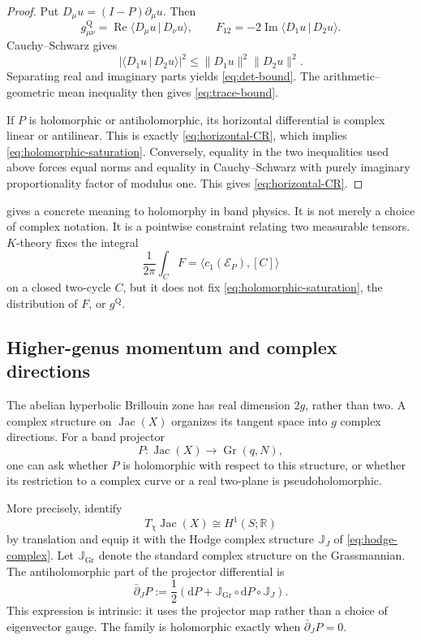 \documentclass[11pt]{article}
\theoremstyle{definition}
\theoremstyle{remark}
\newcommand{\RR}{\mathbb R}
\newcommand{\Jac}{\operatorname{Jac}}
\newcommand{\dd}{\mathrm d}
\newcommand{\braket}[2]{\langle #1\,|\,#2\rangle}
\begin{document}
\begin{proof}
Put \(D_\mu u=(I-P)\partial_\mu u\).  Then
\[
   g_{\mu\nu}^{\mathrm Q}
       =\operatorname{Re}\braket{D_\mu u}{D_\nu u},
   \qquad
   F_{12}=-2\operatorname{Im}\braket{D_1u}{D_2u}.
\]
Cauchy--Schwarz gives
\[
 |\braket{D_1u}{D_2u}|^2
   \leq\|D_1u\|^2\|D_2u\|^2.
\]
Separating real and imaginary parts yields
\eqref{eq:det-bound}.  The arithmetic--geometric mean inequality then gives
\eqref{eq:trace-bound}.

If \(P\) is holomorphic or antiholomorphic, its horizontal differential is
complex linear or antilinear.  This is exactly
\eqref{eq:horizontal-CR}, which implies
\eqref{eq:holomorphic-saturation}.  Conversely, equality in the two
inequalities used above forces equal norms and equality in Cauchy--Schwarz
with purely imaginary proportionality factor of modulus one.  This gives
\eqref{eq:horizontal-CR}.
\end{proof}

 gives a concrete meaning to holomorphy in
band physics.  It is not merely a choice of complex notation.  It is a
pointwise constraint relating two measurable tensors.  \(K\)-theory fixes the
integral
\[
                \frac1{2\pi}\int_C F
                =\langle c_1(\mathscr E_P),[C]\rangle
                \tag{7.15}\label{eq:chern-integral}
\]
on a closed two-cycle \(C\), but it does not fix
\eqref{eq:holomorphic-saturation}, the distribution of \(F\), or
\(g^{\mathrm Q}\).

\subsection{Higher-genus momentum and complex directions}

The abelian hyperbolic Brillouin zone has real dimension \(2g\), rather than
two.  A complex structure on \(\Jac(X)\) organizes its tangent space into
\(g\) complex directions.  For a band projector
\[
             P:\Jac(X)\longrightarrow\operatorname{Gr}(q,N),
\]
one can ask whether \(P\) is holomorphic with respect to this structure, or
whether its restriction to a complex curve or a real two-plane is
pseudoholomorphic.

More precisely, identify
\[
 T_\chi\Jac(X)\cong H^1(S;\RR)
\]
by translation and equip it with the Hodge complex structure
\(\mathbb J_J\) of \eqref{eq:hodge-complex}.  Let
\(\mathbb J_{\mathrm{Gr}}\) denote the standard complex structure on the
Grassmannian.  The antiholomorphic part of the projector differential is
\[
 \bar\partial_JP
   :=\frac12\left(
       \dd P+
       \mathbb J_{\mathrm{Gr}}\circ\dd P\circ\mathbb J_J
     \right).
 \tag{7.16}\label{eq:dbar-projector}
\]
This expression is intrinsic: it uses the projector map rather than a choice
of eigenvector gauge.  The family is holomorphic exactly when
\(\bar\partial_JP=0\).
\end{document}
